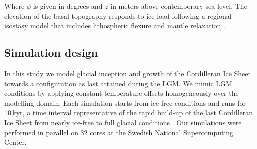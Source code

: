 Where $\phi$ is given in degrees and $z$ in meters above contemporary sea level. The elevation of the basal topography responds to ice load following a regional isostasy model that includes lithospheric flexure and mantle relaxation \citep{lingle-clark-1985}.

\subsection{Simulation design}

In this study we model glacial inception and growth of the Cordilleran Ice Sheet towards a configuration as last attained during the LGM. We mimic LGM conditions by applying constant temperature offsets homogeneously over the modelling domain. Each simulation starts from ice-free conditions and runs for 10\,kyr, a time interval representative of the rapid build-up of the last Cordilleran Ice Sheet from nearly ice-free to full glacial conditions \citep{clague-1989}. Our simulations were performed in parallel on 32 cores at the Swedish National Supercomputing Center.

